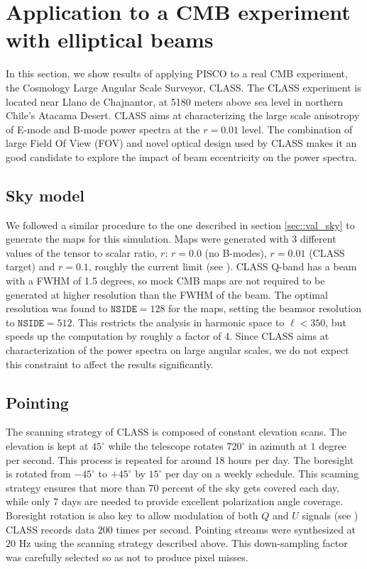\documentclass[a4paper,fleqn]{cas-dc}\sloppy
\begin{document}
	\section{Application to a CMB experiment with elliptical beams}
	\label{sec::class_pisco_sim}
	
	In this section, we show results of applying PISCO to a real CMB experiment, the Cosmology Large Angular Scale Surveyor, CLASS. The CLASS experiment is located near Llano de Chajnantor, at 5180 meters above sea level in northern Chile's Atacama Desert. CLASS aims at characterizing the large scale anisotropy of E-mode and B-mode power spectra at the $r=0.01$ level. The combination of large Field Of View (FOV) and novel optical design used by CLASS makes it an good candidate to explore the impact of beam eccentricity on the power spectra. 
	
	\subsection{Sky model}
	
	We followed a similar procedure to the one described in section \ref{sec::val_sky} to generate the maps for this simulation. Maps were generated with 3 different values of the tensor to scalar ratio, $r$: $r=0.0$ (no B-modes), $r=0.01$ (CLASS target) and $r=0.1$, roughly the current limit (see \cite{2018PhRvL.121v1301B}). CLASS Q-band has a beam with a FWHM of 1.5 degrees, so mock CMB maps are not required to be generated at higher resolution than the FWHM of the beam. The optimal resolution was found to $\mathrm{\texttt{NSIDE}} = 128$ for the maps, setting the beamsor resolution to $\mathrm{\texttt{NSIDE}} = 512$. This restricts the analysis in harmonic space to $\ell < 350$, but speeds up the computation by roughly a factor of 4. Since CLASS aims at characterization of the power spectra on large angular scales, we do not expect this constraint to affect the results significantly.
	
	\subsection{Pointing}
	
	The scanning strategy of CLASS is composed of constant elevation scans. The elevation is kept at $45^{\circ}$ while the telescope rotates $720^\circ$ in azimuth at $1$ degree per second. This process is repeated for around 18 hours per day. The boresight is rotated from $-45^{\circ}$ to $+45^{\circ}$ by $15^{\circ}$ per day on a weekly schedule. This scanning strategy ensures that more than 70 percent of the sky gets covered each day, while only 7 days are needed to provide excellent polarization angle coverage. Boresight rotation is also key to allow modulation of both $Q$ and $U$ signals (see \cite{2016SPIE.9914E..1KH}) CLASS records data $200$ times per second. Pointing streams were synthesized at $20$ Hz using the scanning strategy described above. This down-sampling factor was carefully selected so as not to produce pixel misses. 
	
\end{document}
